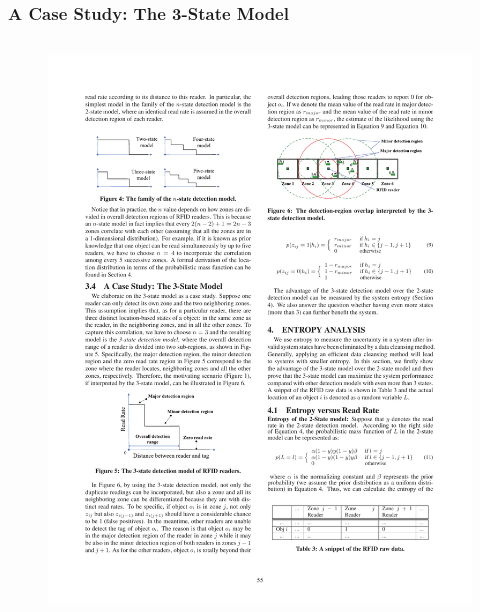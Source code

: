 \begin{frame}
\frametitle{A Case Study: The 3-State Model}

\begin{columns}[c]

  \begin{figure}[tb]
    \includegraphics[width=\columnwidth]{figures/3-1/3-1-6.pdf}
  \end{figure}


\end{columns}
\end{frame}
